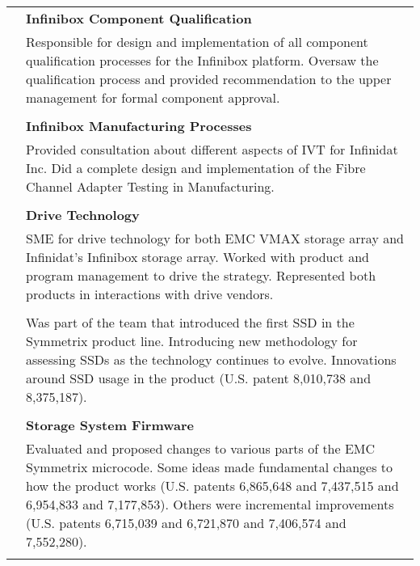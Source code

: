 \documentclass[10pt]{article}
\begin{document}
\begin{longtable}{p{91pt}p{390pt}}
                       \\
                       & {\bf Infinibox Component Qualification}\\
                       & {Responsible for design and implementation of all component qualification processes for the Infinibox platform. Oversaw the
                        qualification process and provided recommendation to the upper management for formal component approval.}\\
                    \\
                       & {\bf Infinibox Manufacturing Processes}\\
                       & {Provided consultation about different aspects of IVT for Infinidat Inc. Did a complete design and implementation of the Fibre 
                Channel Adapter Testing in Manufacturing.}\\
                \\
                       & {\bf Drive Technology}\\
                       & {SME for drive technology for both EMC VMAX storage array and Infinidat's Infinibox storage array.
                          Worked with product and program management to drive the strategy. Represented both products in interactions with drive vendors.}\\
\\
                        & {Was part of the team that introduced the first SSD in the Symmetrix product line. Introducing new methodology
                          for assessing SSDs as the technology continues to evolve. Innovations around SSD usage in the product
                          (U.S. patent 8,010,738 and 8,375,187).}\\
\\
                       & {\bf Storage System Firmware}\\
                       & {Evaluated and proposed changes to various parts of the EMC Symmetrix microcode.
		       Some ideas made fundamental changes to how the product works
		       (U.S. patents 6,865,648 and 7,437,515 and 6,954,833 and 7,177,853). Others were incremental improvements
		       (U.S. patents 6,715,039 and 6,721,870 and 7,406,574 and 7,552,280).}\\
\\
\end{longtable}
\end{document}
